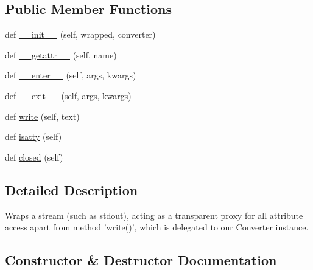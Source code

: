 \subsection*{Public Member Functions}
\begin{DoxyCompactItemize}
\item 
def \hyperlink{classpip_1_1__vendor_1_1colorama_1_1ansitowin32_1_1StreamWrapper_a5e9bf3b0dc036e99b75451d463c869da}{\+\_\+\+\_\+init\+\_\+\+\_\+} (self, wrapped, converter)
\item 
def \hyperlink{classpip_1_1__vendor_1_1colorama_1_1ansitowin32_1_1StreamWrapper_aa977df49f46b035f1b0bf589afa9207e}{\+\_\+\+\_\+getattr\+\_\+\+\_\+} (self, name)
\item 
def \hyperlink{classpip_1_1__vendor_1_1colorama_1_1ansitowin32_1_1StreamWrapper_a34b0dc5d0211781813b81d89555f9a6c}{\+\_\+\+\_\+enter\+\_\+\+\_\+} (self, args, kwargs)
\item 
def \hyperlink{classpip_1_1__vendor_1_1colorama_1_1ansitowin32_1_1StreamWrapper_a9e10de40ad9de4767be4b1da4bb34603}{\+\_\+\+\_\+exit\+\_\+\+\_\+} (self, args, kwargs)
\item 
def \hyperlink{classpip_1_1__vendor_1_1colorama_1_1ansitowin32_1_1StreamWrapper_a0e7f0a273c12591e09743620d9510abf}{write} (self, text)
\item 
def \hyperlink{classpip_1_1__vendor_1_1colorama_1_1ansitowin32_1_1StreamWrapper_a47eaa878948922c42c6bda5fc768b7b0}{isatty} (self)
\item 
def \hyperlink{classpip_1_1__vendor_1_1colorama_1_1ansitowin32_1_1StreamWrapper_a6d3234e192b23abc051af465d71fb399}{closed} (self)
\end{DoxyCompactItemize}


\subsection{Detailed Description}
\begin{DoxyVerb}Wraps a stream (such as stdout), acting as a transparent proxy for all
attribute access apart from method 'write()', which is delegated to our
Converter instance.
\end{DoxyVerb}
 

\subsection{Constructor \& Destructor Documentation}
\mbox{\label{classpip_1_1__vendor_1_1colorama_1_1ansitowin32_1_1StreamWrapper_a5e9bf3b0dc036e99b75451d463c869da}} 
